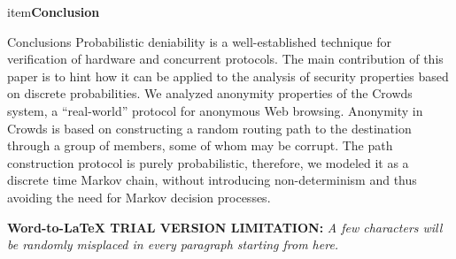 \documentclass[10pt]{article}
\begin{document}
\begin{enumerate}
	item\textbf{{\large Conclusion}}
\end {enumerate}
{\raggedright
{\large Conclusions
Probabilistic deniability is a well-established technique for verification of hardware and concurrent protocols. The main contribution of this paper is to hint how it can be applied to the analysis of security properties based on discrete probabilities. We analyzed anonymity properties of the Crowds system, a “real-world” protocol for anonymous Web browsing. Anonymity in Crowds is based on constructing a random routing path to the destination through a group of members, some of whom may be corrupt. The path construction protocol is purely probabilistic, therefore, we modeled it as a discrete time Markov chain, without introducing non-determinism and thus avoiding the need for Markov decision processes.
}
}
{\large  }
\textbf{Word-to-LaTeX TRIAL VERSION LIMITATION:}\textit{ A few characters will be randomly misplaced in every paragraph starting from here.}
\end{document}
